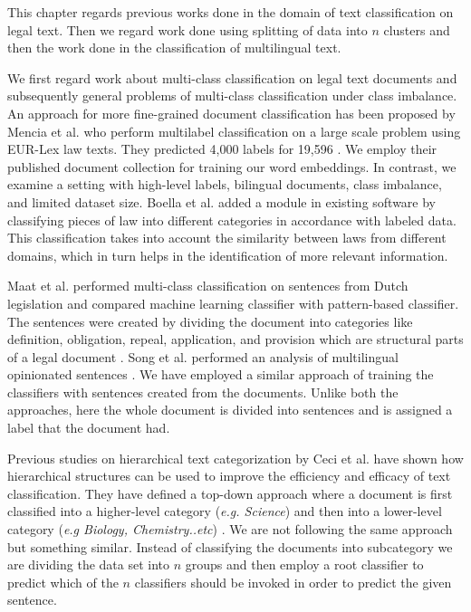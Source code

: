 \label{ch:relatedwork}

This chapter regards previous works done in the domain of text classification on legal text. Then we regard work done using splitting of data into $n$ clusters and then the work done in the classification of multilingual text.

We first regard work about multi-class classification on legal text documents and subsequently general problems of multi-class classification under class imbalance. An approach for more fine-grained document classification has been proposed by Mencia et al. who perform multilabel classification on a large scale problem using EUR-Lex law texts. They predicted 4,000 labels for 19,596  \cite{mencia2010efficient}. We employ their published document collection for training our word embeddings. In contrast, we examine a setting with high-level labels, bilingual documents, class imbalance, and limited dataset size. Boella et al. added a module in existing software by classifying pieces of law into different categories in accordance with labeled data. This classification takes into account the similarity between laws from different domains, which in turn helps in the identification of more relevant information. 


Maat et al. performed multi-class classification on sentences from Dutch legislation and compared machine learning classifier with pattern-based classifier. The sentences were created by dividing the document into categories like definition,  obligation,  repeal, application, and provision which are structural parts of a legal document \cite{de2010machine}. Song et al. performed an analysis of multilingual opinionated sentences \cite{oro15675}. We have employed a similar approach of training the classifiers with sentences created from the documents. Unlike both the approaches, here the whole document is divided into sentences and is assigned a label that the document had. 

Previous studies on hierarchical text categorization by Ceci et al. have shown how hierarchical structures can be used to improve the efficiency and efficacy of text classification. They have defined a top-down approach where a document is first classified into a higher-level category (\textit{e.g. Science}) and then into a lower-level category (\textit{e.g Biology, Chemistry..etc}) \cite{Ceci2007}. We are not following the same approach but something similar. Instead of classifying the documents into subcategory we are dividing the data set into $n$ groups and then employ a root classifier to predict which of the $n$ classifiers should be invoked in order to predict the given sentence.    

